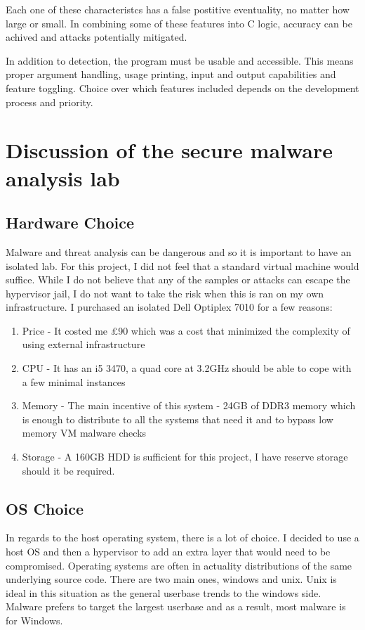 Each one of these characteristcs has a false postitive eventuality, no matter how large or small. In combining some of these features into C logic, accuracy can be achived and attacks potentially mitigated.

In addition to detection, the program must be usable and accessible. This means proper argument handling, usage printing, input and output capabilities and feature toggling. Choice over which features included depends on the development process and priority.

\chapter{Discussion of the secure malware analysis lab}
\section{Hardware Choice}
Malware and threat analysis can be dangerous and so it is important to have an isolated lab. For this project, I did not feel that a standard virtual machine would suffice. While I do not believe that any of the samples or attacks can escape the hypervisor jail, I do not want to take the risk when this is ran on my own infrastructure. 
I purchased an isolated Dell Optiplex 7010 for a few reasons: 
\begin{enumerate}
    \item Price - It costed me £90 which was a cost that minimized the complexity of using external infrastructure
    \item CPU - It has an i5 3470, a quad core at 3.2GHz should be able to cope with a few minimal instances
    \item Memory - The main incentive of this system - 24GB of DDR3 memory which is enough to distribute to all the systems that need it and to bypass low memory VM malware checks
    \item Storage - A 160GB HDD is sufficient for this project, I have reserve storage should it be required.
\end{enumerate}

\section{OS Choice}
In regards to the host operating system, there is a lot of choice. I decided to use a host OS and then a hypervisor to add an extra layer that would need to be compromised. Operating systems are often in actuality distributions of the same underlying source code. There are two main ones, windows and unix. Unix is ideal in this situation as the general userbase trends to the windows side. Malware prefers to target the largest userbase and as a result, most malware is for Windows.

